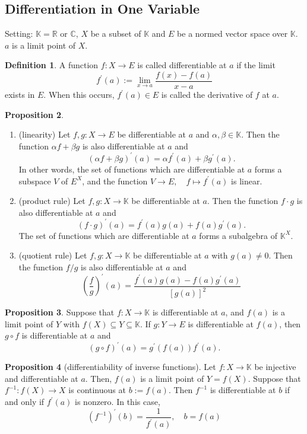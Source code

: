 \documentclass[12pt,a4paper]{book}
\newcommand{\bb}[1]{\mathbb{#1}}
\newenvironment{enu}{\begin{enumerate}[(1)]}{\end{enumerate}}
\theoremstyle{definition}
\newtheorem{defn}{Definition}[section]
\newtheorem{prop}[defn]{Proposition}
\begin{document}
\subsection{Differentiation in One Variable}
Setting: $\bb{K}=\bb{R}$ or $\bb{C}$, $X$ be a subset of $\bb{K}$ and $E$ be a normed vector space over $\bb{K}$. $a$ is a limit point of $X$.
\begin{defn}
    A function $f: X \rightarrow E$ is called differentiable at $a$ if the limit
    $$
    f^{\prime}(a):=\lim _{x \rightarrow a} \frac{f(x)-f(a)}{x-a}
    $$
    exists in $E$. When this occurs, $f^{\prime}(a) \in E$ is called the derivative of $f$ at $a$.
\end{defn}
\begin{prop}
    \begin{enu}
    \item (linearity) Let $f, g: X \rightarrow E$ be differentiable at $a$ and $\alpha, \beta \in \mathbb{K}$. Then the function $\alpha f+\beta g$ is also differentiable at $a$ and
    $$
    (\alpha f+\beta g)^{\prime}(a)=\alpha f^{\prime}(a)+\beta g^{\prime}(a) .
    $$
    In other words, the set of functions which are differentiable at $a$ forms a subspace $V$ of $E^X$, and the function $V \rightarrow E, \quad f \mapsto f^{\prime}(a)$ is linear.
    \item (product rule) Let $f, g: X \rightarrow \mathbb{K}$ be differentiable at $a$. Then the function $f \cdot g$ is also differentiable at $a$ and
    $$
    (f \cdot g)^{\prime}(a)=f^{\prime}(a) g(a)+f(a) g^{\prime}(a) .
    $$
    The set of functions which are differentiable at $a$ forms a subalgebra of $\mathbb{K}^X$.
    \item  (quotient rule) Let $f, g: X \rightarrow \mathbb{K}$ be differentiable at $a$ with $g(a) \neq 0$. Then the function $f / g$ is also differentiable at $a$ and
    $$
    \left(\frac{f}{g}\right)^{\prime}(a)=\frac{f^{\prime}(a) g(a)-f(a) g^{\prime}(a)}{[g(a)]^2}
    $$
    \end{enu}
\end{prop}
\begin{prop}
    Suppose that $f: X \rightarrow \mathbb{K}$ is differentiable at $a$, and $f(a)$ is a limit point of $Y$ with $f(X) \subseteq Y \subseteq \mathbb{K}$. If $g: Y \rightarrow E$ is differentiable at $f(a)$, then $g \circ f$ is differentiable at $a$ and
    $$
    (g \circ f)^{\prime}(a)=g^{\prime}(f(a)) f^{\prime}(a) .
    $$
\end{prop}
\begin{prop}[differentiability of inverse functions]
    Let $f: X \rightarrow \mathbb{K}$ be injective and differentiable at $a$. Then, $f(a)$ is a limit point of $Y=f(X)$. 
    Suppose that $f^{-1}: f(X) \rightarrow X$ is continuous at $b:=f(a)$. Then $f^{-1}$ is differentiable at $b$ if and only if $f^{\prime}(a)$ is nonzero. In this case,
    $$
    \left(f^{-1}\right)^{\prime}(b)=\frac{1}{f^{\prime}(a)}, \quad b=f(a)
    $$
    \label{differentiability of inverse functions}
\end{prop}
\end{document}
